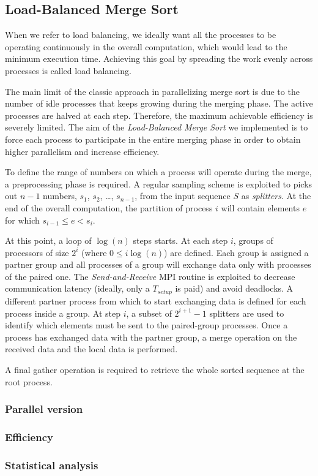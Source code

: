 \subsection{Load-Balanced Merge Sort}
When we refer to load balancing, we ideally want all the processes to be operating continuously in the overall computation, which would lead to the minimum execution time. Achieving this goal by spreading the work evenly across processes is called load balancing.

The main limit of the classic approach in parallelizing merge sort is due to the number of idle processes that keeps growing during the merging phase. The active processes are halved at each step. Therefore, the maximum achievable efficiency is severely limited. The aim of the \textit{Load-Balanced Merge Sort} we implemented is to force each process to participate in the entire merging phase in order to obtain higher parallelism and increase efficiency.

To define the range of numbers on which a process will operate during the merge, a preprocessing phase is required. A regular sampling scheme is exploited to picks out $n-1$ numbers, $s_1$, $s_2$, \dots, $s_{n-1}$, from the input sequence $S$ as \textit{splitters}. At the end of the overall computation, the partition of process $i$ will contain elements $e$ for which $s_{i-1} \leq e < s_i$.

At this point, a loop of $\log (n)$ steps starts. At each step $i$, groups of processors of size $2^i$ (where $0 \leq i \log(n)$) are defined. Each group is assigned a partner group and all processes of a group will exchange data only with processes of the paired one. The \textit{Send-and-Receive} MPI routine is exploited to decrease communication latency (ideally, only a $T_{setup}$ is paid) and avoid deadlocks. A different partner process from which to start exchanging data is defined for each process inside a group. At step $i$, a subset of $2^{i+1}-1$ splitters are used to identify which elements must be sent to the paired-group processes. Once a process has exchanged data with the partner group, a merge operation on the received data and the local data is performed.

A final gather operation is required to retrieve the whole sorted sequence at the root process.



\subsubsection*{Parallel version}
\subsubsection*{Efficiency} 
\subsubsection*{Statistical analysis}